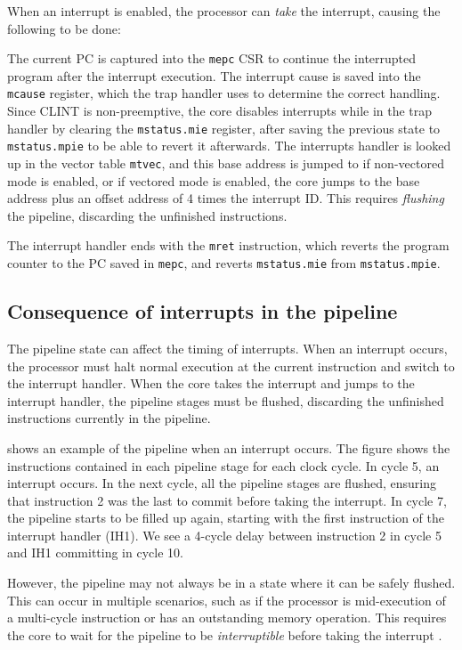 When an interrupt is enabled, the processor can \textit{take} the interrupt, causing the following to be done:

The current PC is captured into the \lstinline{mepc} CSR to continue the interrupted program after the interrupt execution. 
The interrupt cause is saved into the \lstinline{mcause} register, which the trap handler uses to determine the correct handling.
Since CLINT is non-preemptive, the core disables interrupts while in the trap handler by clearing the \lstinline{mstatus.mie} register, after saving the previous state to \lstinline{mstatus.mpie} to be able to revert it afterwards. 
The interrupts handler is looked up in the vector table \lstinline{mtvec}, and this base address is jumped to if non-vectored mode is enabled, or if vectored mode is enabled, the core jumps to the base address plus an offset address of 4 times the interrupt ID. This requires \textit{flushing} the pipeline, discarding the unfinished instructions.


The interrupt handler ends with the \lstinline{mret} instruction, which reverts the program counter to the PC saved in \lstinline{mepc}, and reverts \lstinline{mstatus.mie} from \lstinline{mstatus.mpie}.

\subsection{Consequence of interrupts in the pipeline}

The pipeline state can affect the timing of interrupts. When an interrupt occurs, the processor must halt normal execution at the current instruction and switch to the interrupt handler.  When the core takes the interrupt and jumps to the interrupt handler, the pipeline stages must be flushed, discarding the unfinished instructions currently in the pipeline. 

 shows an example of the pipeline when an interrupt occurs. The figure shows the instructions contained in each pipeline stage for each clock cycle. In cycle 5, an interrupt occurs. In the next cycle, all the pipeline stages are flushed, ensuring that instruction 2 was the last to commit before taking the interrupt. In cycle 7, the pipeline starts to be filled up again, starting with the first instruction of the interrupt handler (IH1). We see a 4-cycle delay between instruction 2 in cycle 5 and IH1 committing in cycle 10.

However, the pipeline may not always be in a state where it can be safely flushed. This can occur in multiple scenarios, such as if the processor is mid-execution of a multi-cycle instruction or has an outstanding memory operation. This requires the core to wait for the pipeline to be \textit{interruptible} before taking the interrupt \cite{taylorAdvancedRISCVVerification2023}.



